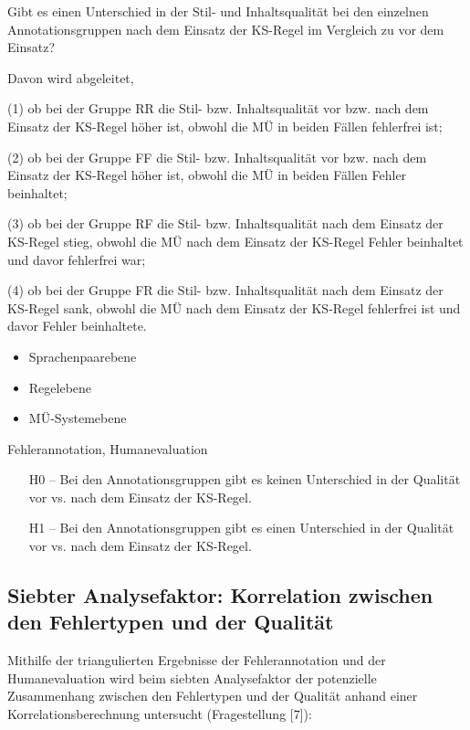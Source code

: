 \begin{description}[font=\normalfont\bfseries]
\item [Fragestellung] Gibt es einen Unterschied in der Stil- und Inhaltsqualität bei den einzelnen Annotationsgruppen nach dem Einsatz der KS-Regel im Vergleich zu vor dem Einsatz?

Davon wird abgeleitet,

(1) ob bei der Gruppe RR die Stil- bzw. Inhaltsqualität vor bzw. nach dem Einsatz der KS-Regel höher ist, obwohl die MÜ in beiden Fällen fehlerfrei ist;

(2) ob bei der Gruppe FF die Stil- bzw. Inhaltsqualität vor bzw. nach dem Einsatz der KS-Regel höher ist, obwohl die MÜ in beiden Fällen Fehler beinhaltet;

(3) ob bei der Gruppe RF die Stil- bzw. Inhaltsqualität nach dem Einsatz der KS-Regel stieg, obwohl die MÜ nach dem Einsatz der KS-Regel Fehler beinhaltet und davor fehlerfrei war;

(4) ob bei der Gruppe FR die Stil- bzw. Inhaltsqualität nach dem Einsatz der KS-Regel sank, obwohl die MÜ nach dem Einsatz der KS-Regel fehlerfrei ist und davor Fehler beinhaltete.
\item [Analyseebene]\hfill
  \begin{itemize}
  \item Sprachenpaarebene
  \item Regelebene
  \item MÜ-Systemebene
  \end{itemize}
\item [Analysemethode] Fehlerannotation, Humanevaluation
\item [Hypothesen]\hfill
  \begin{itemize}
  \item [H0] -- Bei den Annotationsgruppen gibt es keinen Unterschied in der Qualität vor vs. nach dem Einsatz der KS-Regel.
  \item [H1] -- Bei den Annotationsgruppen gibt es einen Unterschied in der Qualität vor vs. nach dem Einsatz der KS-Regel.
  \end{itemize}
\end{description}


\subsection*{Siebter Analysefaktor: Korrelation zwischen den Fehlertypen und der Qualität}

Mithilfe der triangulierten Ergebnisse der Fehlerannotation und der Humanevaluation wird beim siebten Analysefaktor der potenzielle Zusammenhang zwischen den Fehlertypen und der Qualität anhand einer Korrelationsberechnung untersucht (Fragestellung [7]):

